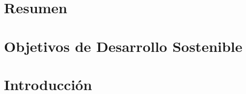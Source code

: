 \documentclass[a4page, 11pt, showtrims]{memoir}
\title{\izenburua}
\author{\egilea}
\date{\data}
\begin{document}
	
%




%
%
%

\cleardoublepage
\frontmatter


%


\chapter*{Resumen}

\cleardoublepage

\chapter*{Objetivos de Desarrollo Sostenible}

\cleardoublepage


\tableofcontents
\clearpage
\listoffigures
\clearpage
\listoftables
\clearpage
{}



\cleardoublepage
\mainmatter

\chapter{Introducción} \label{ch:chap1}

\clearpage
\end{document}
